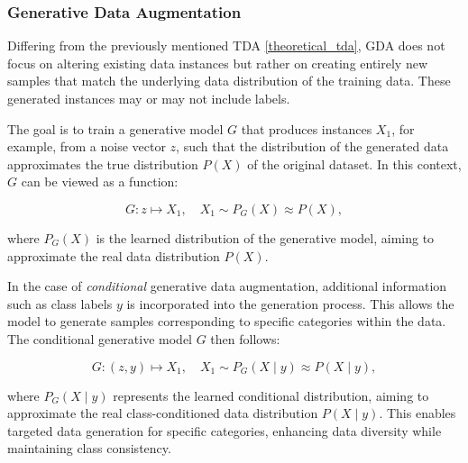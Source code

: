\subsubsection[Generative Data Augmentation - GDA]{Generative Data Augmentation}\label{theoretical_gda}
Differing from the previously mentioned TDA \ref{theoretical_tda}, GDA does not focus on altering existing data instances but rather on creating entirely new samples that match the underlying data distribution of the training data. These generated instances may or may not include labels.

The goal is to train a generative model \( G \) that produces instances \( X_1 \), for example, from a noise vector \( z \), such that the distribution of the generated data approximates the true distribution \( P(X) \) of the original dataset. In this context, \( G \) can be viewed as a function:

\[
G: z \mapsto X_1, \quad X_1 \sim P_G(X) \approx P(X),
\]

\noindent
where \( P_G(X) \) is the learned distribution of the generative model, aiming to approximate the real data distribution \( P(X) \).

In the case of \textit{conditional} generative data augmentation, additional information such as class labels \( y \) is incorporated into the generation process. This allows the model to generate samples corresponding to specific categories within the data. The conditional generative model \( G \) then follows:

\[
G: (z, y) \mapsto X_1, \quad X_1 \sim P_G(X \mid y) \approx P(X \mid y),
\]

\noindent
where \( P_G(X \mid y) \) represents the learned conditional distribution, aiming to approximate the real class-conditioned data distribution \( P(X \mid y) \). This enables targeted data generation for specific categories, enhancing data diversity while maintaining class consistency.





